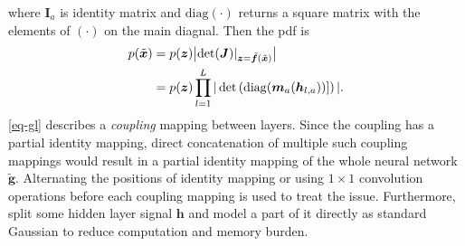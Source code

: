 where $\bm{I}_a$ is identity matrix and $\mathrm{diag}(\cdot)$ returns a square matrix with the elements of $(\cdot)$ on the main diagnal. Then the pdf is
\begin{align}
  p(\tilde{\bm{x}}) & =  p(\bm{z}) \big| \mathrm{det}(\bm{J}) |_{\bm{z}=\tilde{\bm{f}}(\tilde{\bm{x}})}\big| \nonumber\\
                    &  = p(\bm{z}) \prod_{l=1}^L | \det\left( \mathrm{diag}(\bm{m}_a(\bm{h}_{l,a}))]  \right) |.
\end{align}
\autoref{eq-gl} describes a \textit{coupling} mapping between layers. Since the coupling has a partial identity mapping, direct concatenation of multiple such coupling mappings would result in a partial identity mapping of the whole neural network $\tilde{\bm{g}}$. Alternating the positions of identity mapping \cite{2016arXiv160508803D} or using $1\times1$ convolution operations \cite{2018arXiv180703039K} before each coupling mapping is used to treat the issue.
Furthermore, \cite{2016arXiv160508803D}\cite{2018arXiv180703039K} split some hidden
layer signal $\bm{h}$ and model a part of it directly as standard Gaussian to reduce computation and memory burden.


